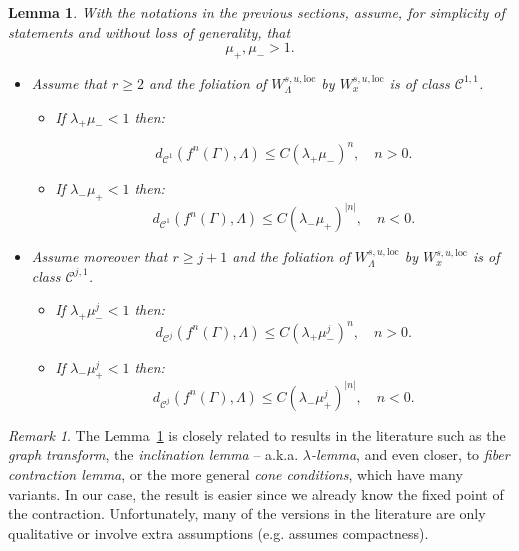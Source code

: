 \documentclass[11pt]{amsart}
\newtheorem{lem}[thm]{Lemma}
\theoremstyle{definition}
\theoremstyle{remark}
\newtheorem{rem}[thm]{Remark}
\numberwithin{equation}{section}
\newcommand{\C}{\mathcal{C}}
\begin{document}
\begin{lem}\label{convergence_rates}
  With the notations in the previous sections,
  assume, for simplicity  of statements and without loss of generality,
  that
  \begin{equation}\label{simplicity}
    \mu_+, \mu_- > 1.
  \end{equation}
\begin{itemize}
\item[(i)]
Assume that $ r\ge 2$ and  the foliation of $W^{s,u, \textrm{loc}}_\Lambda$ by $W^{s, u,\textrm{loc}}_x$ is of class  $\C^{1, 1}$.
  \begin{itemize}
  \item[(i.a)]
  If  $\lambda_+\mu_-<1$ then:

 \begin{equation}\label{Cr-ratess}
   d_{\C^1} (f^n(\Gamma), \Lambda) \le
      C  (\lambda_+  \mu_-)^n, \quad n > 0 .
  \end{equation}
\item [(i.b)]
If  $\lambda_-\mu_+<1$ then:
  \begin{equation}\label{Cr-ratesu}
   d_{\C^1} (f^n(\Gamma), \Lambda) \le    C  (\lambda_- \mu_+)^{|n|}, \quad n < 0 .
  \end{equation}
 \end{itemize}
 \item[(ii)]
 Assume moreover that $ r\ge j+1$ and the foliation of
 $W^{s,u, \textrm{loc}}_\Lambda$ by $W^{s, u,\textrm{loc}}_x$ is of class  $\C^{j, 1}$.
  \begin{itemize}
  \item[(ii.a)]
  If $\lambda_+ \mu_-^j<1$ then:
 \begin{equation}\label{Cr-ratessj}
   d_{\C^j} (f^n(\Gamma), \Lambda) \le     C  (\lambda_+ \mu_-^j)^n, \quad n > 0 .
  \end{equation}
\item[(ii.b)]
 If $\lambda_- \mu_+^j<1$ then:
  \begin{equation}\label{Cr-ratesuj}
   d_{\C^j} (f^n(\Gamma), \Lambda) \le      C  (\lambda_- \mu_+^j)^{|n|}, \quad n < 0 .
  \end{equation}
 \end{itemize}
\end{itemize}





\end{lem}


\begin{rem}
The Lemma~\ref{convergence_rates}
is closely related to results in the literature such as the
\emph{graph transform}, the \emph{inclination lemma} -- a.k.a. \emph{$\lambda$-lemma},
and even closer, to \emph{fiber contraction lemma}, or the  more general
\emph{cone conditions}, which have many variants. In our case, the result is easier
since we already know the fixed point of the contraction.
Unfortunately, many of the versions in the literature are only qualitative or involve
extra assumptions (e.g. \cite[p. 35]{HPS} assumes compactness).
\end{rem}
\end{document}
